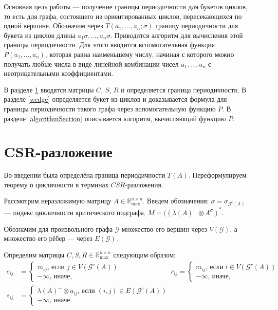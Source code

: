 \documentclass[12pt]{article}
\theoremstyle{definition}
\begin{document}
Основная цель работы --- получение границы периодичности для букетов циклов, то есть для графа, состоящего из ориентированных циклов, пересекающихся по одной вершине. Обозначим через $T(a_1, \dots, a_n; \sigma)$ границу периодичности для букета из циклов длины $a_1\sigma, \dots, a_n\sigma$. Приводится алгоритм для вычисления этой границы периодичности. Для этого вводится вспомогательная функция $P(a_1, \dots, a_n)$, которая равна наименьшему числу, начиная с которого можно получать любые числа в виде линейной комбинации чисел $a_1, \dots, a_n$ с неотрицательными коэффициентами.

В разделе \ref{CSR} вводятся матрицы $C$, $S$, $R$ и определяется граница периодичности. В разделе \ref{wedge} определяется букет из циклов и доказывается формула для границы периодичности такого графа через вспомогательную функцию $P$. В разделе \ref{algorithmSection} описывается алгоритм, вычисляющий функцию $P$.

\section{CSR-разложение}
\label{CSR}
Во введении была определёна граница периодичности $T(A)$. Переформулируем теорему о цикличности в терминах $CSR$-разложения.

Рассмотрим неразложимую матрицу $A \in \mathbb{R}_{\max}^{n \times n}$. Введем обозначения: $\sigma = \sigma_{\mathcal{G}^c(A)}$ --- индекс цикличности критического подграфа, $M = ((\lambda(A)^-\otimes A^\sigma)^*$.

Обозначим для произвольного графа $\mathcal{G}$ множество его вершин через $V(\mathcal{G})$, а множество его рёбер --- через $E(\mathcal{G})$.

Определим матрицы $C, S, R \in \mathbb{R}_{\max}^{n \times n}$ следующим образом:
\begin{align*}
    c_{ij} &= \begin{cases}
        m_{ij}\text{, если } j \in V(\mathcal{G}^c(A)) \\
        -\infty \text{, иначе,}
    \end{cases}
    &
    r_{ij} = \begin{cases}
        m_{ij}\text{, если } i \in V(\mathcal{G}^c(A)) \\
        -\infty \text{, иначе,}
    \end{cases}
    \\
    s_{ij} &= \begin{cases}
        \lambda(A)^- \otimes a_{ij}\text{, если } (i, j) \in E(\mathcal{G}^c(A)) \\
        -\infty \text{, иначе.}
    \end{cases}
\end{align*}
\end{document}
